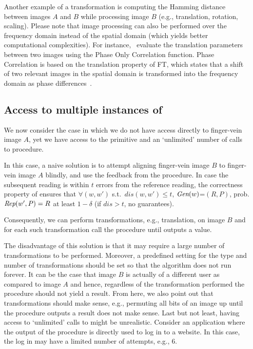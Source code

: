 Another example of a transformation is computing the Hamming distance between images $A$ and $B$ while processing image $B$ (e.g., translation, rotation, scaling).
Please note that image processing can also be performed over the frequency domain instead of the spatial domain (which yields better computational complexities). 
For instance,~\cite{poc,poc2} evaluate the translation parameters between two images using the Phase Only Correlation function. Phase Correlation is based on the translation property of FT, which states that a shift of two relevant images in the spatial domain is transformed into the frequency domain as phase differences~\cite{ft}. 

\subsection{Access to multiple instances of \rep}
We now consider the case in which we do not have access directly to finger-vein image $A$, yet we have access to the \fe primitive and an `unlimited' number of calls to \rep procedure.

In this case, a naive solution is to attempt aligning finger-vein image $B$ to finger-vein image $A$ blindly, and use the feedback from the \rep procedure.
In case the subsequent reading is within $t$ errors from the reference reading, the correctness property of \fe ensures that $\forall (w,w')$ s.t.\ $dis(w,w')\leq t$, $\textit{Gen}(w)$=$(R,P)$, prob. $\textit{Rep}(w',P)=R$ at least $1-\delta$ (if $dis > t$, no guarantees).

Consequently, we can perform transformations, e.g., translation, on image $B$ and for each such transformation call the \rep procedure until \rep outputs a value.

The disadvantage of this solution is that it may require a large number of transformations to be performed. Moreover, a predefined setting for the type and number of transformations should be set so that the algorithm does not run forever. It can be the case that image $B$ is actually of a different user as compared to image $A$ and hence, regardless of the transformation performed the \rep procedure should not yield a result. 
From here, we also point out that transformations should make sense, e.g., permuting all bits of an image up until the \rep procedure outputs a result does not make sense. 
Last but not least, having access to `unlimited' calls to \rep might be unrealistic. Consider an application where the output of the \rep procedure is directly used to log in to a website. In this case, the log in may have a limited number of attempts, e.g., 6.


